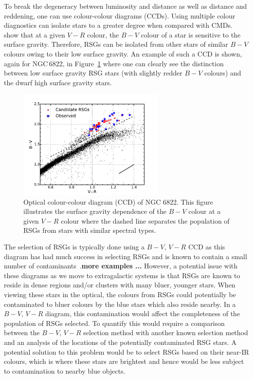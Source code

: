To break the degeneracy between luminosity and distance as well as distance and reddening, one can use colour-colour diagrams (CCDs).
Using multiple colour diagnostics can isolate stars to a greater degree when compared with CMDs.
\cite{1998ApJ...501..153M} show that at a given $V-R$ colour, the $B-V$ colour of a star is sensitive to the surface gravity.
Therefore, RSGs can be isolated from other stars of similar $B-V$ colours owing to their low surface gravity.
An example of such a CCD  is shown, again for NGC\,6822, in Figure~\ref{fig:CCD} where one can clearly see the distinction between low surface gravity RSG stars (with slightly redder $B-V$ colours) and the dwarf high surface gravity stars.

\begin{figure}
 \centering
 \includegraphics[width=0.65\textwidth]{intro/N6822_bvr}
 \caption[Optical $B-V$, $V-R$ colour-colour diagram]{Optical colour-colour diagram (CCD) of NGC 6822. This figure illustrates the surface gravity dependence of the $B-V$ colour at a given $V-R$ colour where the dashed line separates the population of RSGs from stars with similar spectral types.
 \label{fig:CCD}}
\end{figure}

The selection of RSGs is typically done using a $B-V$, $V-R$ CCD as this diagram has had much success in selecting RSGs and is known to contain a small number of contaminants~\citep[e.g.][]{1998ApJ...501..153M,MasseyOlsen03,Levesque05,Levesque06,2012AJ....144....2L,2015ApJ...803...14P}.\textbf{more examples ...}
However, a potential issue with these diagrams as we move to extragalactic systems is that RSGs are known to reside in dense regions and/or clusters with many bluer, younger stars.
When viewing these stars in the optical, the colours from RSGs could potentially be contaminated to bluer colours by the blue stars which also reside nearby.
In a $B-V$, $V-R$ diagram, this contamination would affect the completeness of the population of RSGs selected.
To quantify this would require a comparison between the $B-V$, $V-R$ selection method with another known selection method and an analysis of the locations of the potentially contaminated RSG stars.
A potential solution to this problem would be to select RSGs based on their near-IR colours, which is where these stars are brightest and hence would be less subject to contamination to nearby blue objects.

